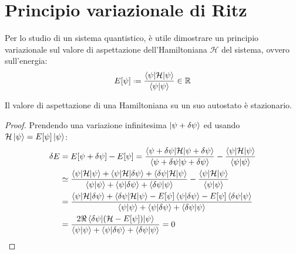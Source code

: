 
\section{Principio variazionale di Ritz}

Per lo studio di un sistema quantistico, è utile dimostrare un principio variazionale sul valore di aspettazione dell'Hamiltoniana $ \mathcal{H} $ del sistema, ovvero sull'energia:
\begin{equation}
	E[\psi] \defeq \frac{\braket{\psi | \mathcal{H} | \psi}}{\braket{\psi | \psi}} \in \R
	\label{eq:1.1}
\end{equation}

\begin{proposition}{}{}
	Il valore di aspettazione di una Hamiltoniana su un suo autostato è stazionario.

	\tcblower

	\begin{proof}
		Prendendo una variazione infinitesima $ \ket{\psi + \delta\psi} $ ed usando $ \mathcal{H} \ket{\psi} = E[\psi] \ket{\psi} $:
		\begin{equation*}
			\begin{split}
				\delta E
				&= E[\psi + \delta\psi] - E[\psi] = \frac{\braket{\psi + \delta\psi | \mathcal{H} | \psi + \delta\psi}}{\braket{\psi + \delta\psi | \psi + \delta\psi}} - \frac{\braket{\psi | \mathcal{H} | \psi}}{\braket{\psi | \psi}} \\
				&\simeq \frac{\braket{\psi | \mathcal{H} | \psi} + \braket{\psi | \mathcal{H} | \delta\psi} + \braket{\delta\psi | \mathcal{H} | \psi}}{\braket{\psi | \psi} + \braket{\psi | \delta\psi} + \braket{\delta\psi | \psi}} - \frac{\braket{\psi | \mathcal{H} | \psi}}{\braket{\psi | \psi}} \\
				&= \frac{\braket{\psi | \mathcal{H} | \delta\psi} + \braket{\delta\psi | \mathcal{H} | \psi} - E[\psi] \braket{\psi | \delta\psi} - E[\psi] \braket{\delta\psi | \psi}}{\braket{\psi | \psi} + \braket{\psi | \delta\psi} + \braket{\delta\psi | \psi}} \\
				&= \frac{2\Re \braket{\delta\psi | (\mathcal{H} - E[\psi]) | \psi}}{\braket{\psi | \psi} + \braket{\psi | \delta\psi} + \braket{\delta\psi | \psi}} = 0
			\end{split}
		\end{equation*}
	\end{proof}
\end{proposition}

